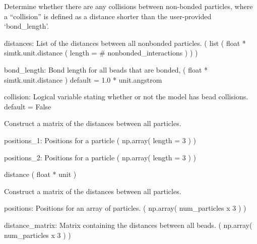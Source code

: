 \documentclass[letterpaper,10pt,english,openany,oneside]{sphinxmanual}
\begin{document}
\begin{fulllineitems}
\label{\detokenize{util:util.collisions}}
Determine whether there are any collisions between non-bonded
particles, where a “collision” is defined as a distance shorter
than the user-provided ‘bond\_length’.

distances: List of the distances between all nonbonded particles.
( list ( float * simtk.unit.distance ( length = \# nonbonded\_interactions ) ) )

bond\_length: Bond length for all beads that are bonded,
( float * simtk.unit.distance )
default = 1.0 * unit.angstrom

collision: Logical variable stating whether or not the model has
bead collisions.
default = False

\end{fulllineitems}


\begin{fulllineitems}
\label{\detokenize{util:util.distance}}
Construct a matrix of the distances between all particles.

positions\_1: Positions for a particle
( np.array( length = 3 ) )

positions\_2: Positions for a particle
( np.array( length = 3 ) )

distance
( float * unit )

\end{fulllineitems}


\begin{fulllineitems}
\label{\detokenize{util:util.distance_matrix}}
Construct a matrix of the distances between all particles.

positions: Positions for an array of particles.
( np.array( num\_particles x 3 ) )

distance\_matrix: Matrix containing the distances between all beads.
( np.array( num\_particles x 3 ) )

\end{fulllineitems}
\end{document}
